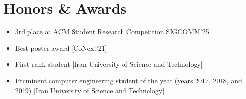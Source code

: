 \section{Honors \& Awards}
\begin{itemize}
	\renewcommand\labelitemi{\ding{118}}
  \item{3rd place at ACM Student Research Competition[SIGCOMM'25]}
	\item {Best poster award [CoNext'21]}
	\item{First rank student [Iran University of Science and Technology]}
	\item{Prominent computer engineering student of the year (years 2017, 2018, and 2019) [Iran University of Science and Technology]}
\end{itemize}

